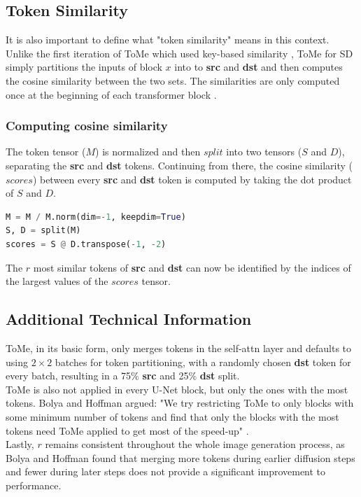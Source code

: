\subsection{Token Similarity}
It is also important to define what "token similarity" means in this context. Unlike the first iteration of ToMe which used key-based similarity \cite{bolya2023tome}, ToMe for SD simply partitions the inputs of block \(x\) into to \textbf{src} and \textbf{dst} and then computes the cosine similarity between the two sets. The similarities are only computed once at the beginning of each transformer block \cite{bolya2023tomesd}.



\subsubsection*{Computing cosine similarity}
The token tensor (\(M\)) is normalized and then \(split\) into two tensors (\(S\) and \(D\)), separating the \textbf{src} and \textbf{dst} tokens.
Continuing from there, the cosine similarity (\(scores\)) between every \textbf{src} and \textbf{dst} token is computed by taking the dot product of \(S\) and \(D\).
\begin{lstlisting}[language=Python]
M = M / M.norm(dim=-1, keepdim=True)
S, D = split(M)
scores = S @ D.transpose(-1, -2)
\end{lstlisting}
The \(r\) most similar tokens of \textbf{src} and \textbf{dst} can now be identified by the indices of the largest values of the \(scores\) tensor.



\subsection{Additional Technical Information}
ToMe, in its basic form, only merges tokens in the self-attn layer and defaults to using \(2 \times 2\) batches for token partitioning, with a randomly chosen \textbf{dst} token for every batch, resulting in a 75\% \textbf{src} and 25\% \textbf{dst} split. \\
ToMe is also not applied in every U-Net block, but only the ones with the most tokens. Bolya and Hoffman argued:
"We try restricting ToMe to only blocks with some minimum number of tokens and find that only the blocks with the most tokens need ToMe applied to get most of the speed-up" \cite{bolya2023tomesd}.\\
Lastly, \(r\) remains consistent throughout the whole image generation process, as Bolya and Hoffman found that merging more tokens during earlier diffusion steps and fewer during later steps does not provide a significant improvement to performance.



